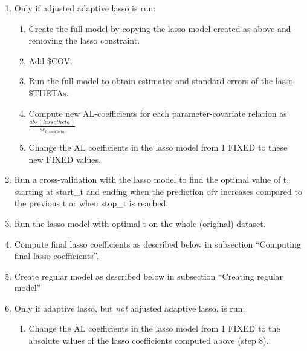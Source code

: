 \begin{enumerate}
\item Only if adjusted adaptive lasso is run: 
\begin{enumerate}
\item Create the full model by copying the lasso model created as above and removing the
lasso constraint. 
\item Add \$COV. 
\item Run the full model to obtain estimates and standard errors of the lasso \$THETAs.
\item Compute new AL-coefficients for each parameter-covariate relation 
as $\frac{abs(lasso theta)}{se_{lasso theta}}$
\item Change the AL coefficients in the lasso model from 1 FIXED to these new FIXED values.
\end{enumerate}
\item Run a cross-validation with the lasso model to find the optimal value of t, 
starting at start\_t and ending when the prediction ofv increases compared to the
previous t or when stop\_t is reached.
\item Run the lasso model with optimal t on the whole (original) dataset. 
\item Compute final lasso coefficients as described below in subsection
``Computing final lasso coefficients''.
\item Create regular model as described below in subsection ``Creating regular model''
\item Only if adaptive lasso, but \emph{not} adjusted adaptive lasso, is run:
\begin{enumerate}
\item Change the AL coefficients in the lasso model from 1 FIXED to the absolute values
of the lasso coefficients computed above (step 8).

\end{enumerate}
\end{enumerate}
